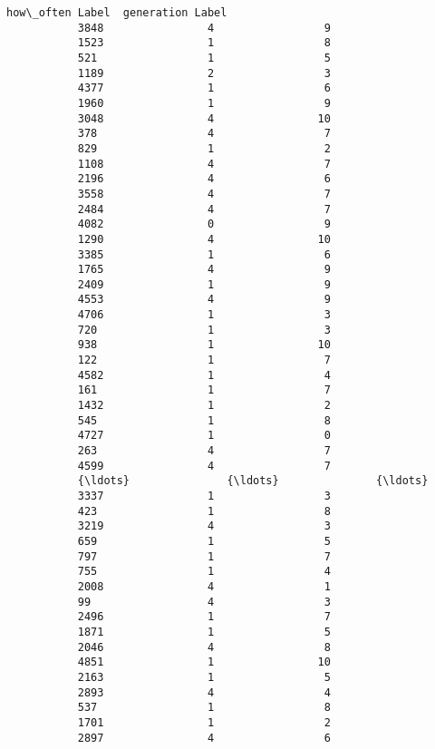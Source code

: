 \documentclass[11pt]{article}
\begin{document}
\begin{Verbatim}[commandchars=\\\{\}]
                 how\_often Label  generation Label  
           3848                4                 9  
           1523                1                 8  
           521                 1                 5  
           1189                2                 3  
           4377                1                 6  
           1960                1                 9  
           3048                4                10  
           378                 4                 7  
           829                 1                 2  
           1108                4                 7  
           2196                4                 6  
           3558                4                 7  
           2484                4                 7  
           4082                0                 9  
           1290                4                10  
           3385                1                 6  
           1765                4                 9  
           2409                1                 9  
           4553                4                 9  
           4706                1                 3  
           720                 1                 3  
           938                 1                10  
           122                 1                 7  
           4582                1                 4  
           161                 1                 7  
           1432                1                 2  
           545                 1                 8  
           4727                1                 0  
           263                 4                 7  
           4599                4                 7  
           {\ldots}               {\ldots}               {\ldots}  
           3337                1                 3  
           423                 1                 8  
           3219                4                 3  
           659                 1                 5  
           797                 1                 7  
           755                 1                 4  
           2008                4                 1  
           99                  4                 3  
           2496                1                 7  
           1871                1                 5  
           2046                4                 8  
           4851                1                10  
           2163                1                 5  
           2893                4                 4  
           537                 1                 8  
           1701                1                 2  
           2897                4                 6  

\end{Verbatim}
\end{document}
